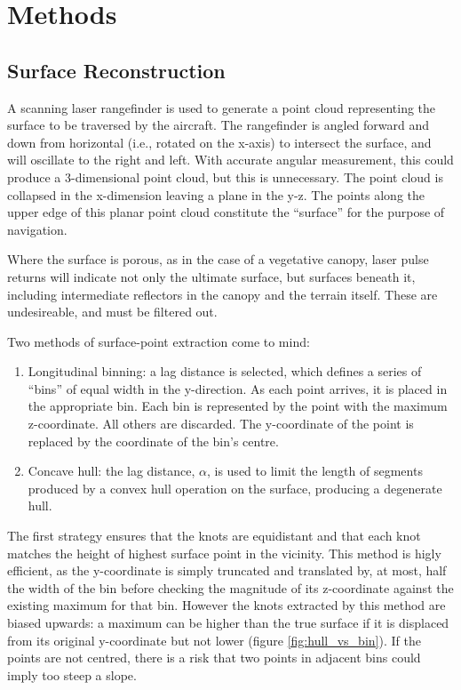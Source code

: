 \documentclass[doc]{apa6}
\begin{document}
\section{Methods}

\subsection{Surface Reconstruction}

A scanning laser rangefinder is used to generate a point cloud representing the surface to be traversed by the aircraft. The rangefinder is angled forward and down from horizontal (i.e., rotated on the x-axis) to intersect the surface, and will oscillate to the right and left. With accurate angular measurement, this could produce a 3-dimensional point cloud, but this is unnecessary. The point cloud is collapsed in the x-dimension leaving a plane in the y-z. The points along the upper edge of this planar point cloud constitute the ``surface'' for the purpose of navigation.

Where the surface is porous, as in the case of a vegetative canopy, laser pulse returns will indicate not only the ultimate surface, but surfaces beneath it, including intermediate reflectors in the canopy and the terrain itself. These are undesireable, and must be filtered out. 

Two methods of surface-point extraction come to mind: 

\begin{enumerate}
\item Longitudinal binning: a lag distance is selected, which defines a series of ``bins'' of equal width in the y-direction. As each point arrives, it is placed in the appropriate bin. Each bin is represented by the point with the maximum z-coordinate. All others are discarded. The y-coordinate of the point is replaced by the coordinate of the bin's centre.
\item Concave hull: the lag distance, $\alpha$, is used to limit the length of segments produced by a convex hull operation on the surface, producing a degenerate hull.
\end{enumerate}

The first strategy ensures that the knots are equidistant and that each knot matches the height of highest surface point in the vicinity. This method is higly efficient, as the y-coordinate is simply truncated and translated by, at most, half the width of the bin before checking the magnitude of its z-coordinate against the existing maximum for that bin. However the knots extracted by this method are biased upwards: a maximum can be higher than the true surface if it is displaced from its original y-coordinate but not lower (figure \ref{fig:hull_vs_bin}). If the points are not centred, there is a risk that two points in adjacent bins could imply too steep a slope.
\end{document}
